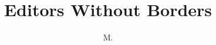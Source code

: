\documentclass[francais, 12pt, fancyChapter, oneside]{these-LUNAM-UBL}
\title{Editors Without Borders}
\author{M.}{Brice}{Nédelec}
\date{}
\begin{document}
\maketitle%
\dominitoc%

\begingroup
\tableofcontents\clearpage
\let\cleardoublepage\relax
\let\clearpage\relax
\listoffigures
\vspace{-30pt}
\renewcommand\listalgorithmname{Liste des algorithmes}
\listofalgorithms%
\vspace{-30pt}
\listoftables
\endgroup



\setlength{\parskip}{0.5em}










\end{document}

